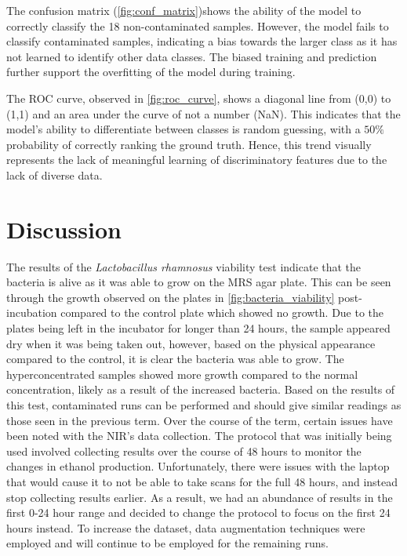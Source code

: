 \documentclass[final, 3p, 11pt]{elsarticle}
\begin{document}
The confusion matrix (\autoref{fig:conf_matrix})shows the ability of the model to correctly classify the 18 non-contaminated samples. However, the model fails to classify contaminated samples, indicating a bias towards the larger class as it has not learned to identify other data classes. The biased training and prediction further support the overfitting of the model during training.

The ROC curve, observed in \autoref{fig:roc_curve}, shows a diagonal line from (0,0) to (1,1) and an area under the curve of not a number (NaN). This indicates that the model’s ability to differentiate between classes is random guessing, with a $50\%$ probability of correctly ranking the ground truth. Hence, this trend visually represents the lack of meaningful learning of discriminatory features due to the lack of diverse data. 

\section{Discussion}

The results of the \textit{Lactobacillus rhamnosus} viability test indicate that the bacteria is alive as it was able to grow on the MRS agar plate. This can be seen through the growth observed on the plates in \autoref{fig:bacteria_viability} post-incubation compared to the control plate which showed no growth. Due to the plates being left in the incubator for longer than 24 hours, the sample appeared dry when it was being taken out, however, based on the physical appearance compared to the control, it is clear the bacteria was able to grow. The hyperconcentrated samples showed more growth compared to the normal concentration, likely as a result of the increased bacteria. Based on the results of this test, contaminated runs can be performed and should give similar readings as those seen in the previous term. 
Over the course of the term, certain issues have been noted with the NIR’s data collection. The protocol that was initially being used involved collecting results over the course of 48 hours to monitor the changes in ethanol production. Unfortunately, there were issues with the laptop that would cause it to not be able to take scans for the full 48 hours, and instead stop collecting results earlier. As a result, we had an abundance of results in the first 0-24 hour range and decided to change the protocol to focus on the first 24 hours instead. To increase the dataset, data augmentation techniques were employed and will continue to be employed for the remaining runs. 
\end{document}
